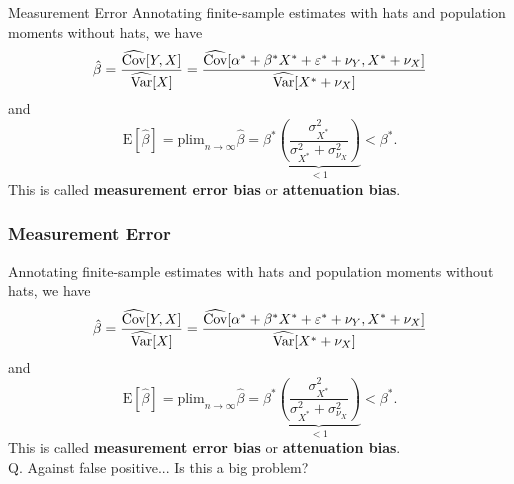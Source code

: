 \begin{frame}{Measurement Error}
    Annotating finite-sample estimates with hats and population moments without hats, we have
\begin{equation*}
    \hat{\beta}
    = \frac{\widehat{\text{Cov}}[Y,X]}{\widehat{\text{Var}}[X]}
    = \frac{\widehat{\text{Cov}}[\alpha^{*} + \beta^{*} X^{*} + \varepsilon^{*} + \nu_{Y}, X^{*}+\nu_{X}]}{\widehat{\text{Var}}[X^{*}+\nu_{X}]}
\end{equation*}
and
\begin{equation*}
    \text{E}[\hat{\beta}] = \text{plim}_{n\rightarrow \infty} \hat{\beta}
    = \beta^{*} \underbrace{\left( \frac{\sigma^{2}_{X^{*}}}{\sigma^{2}_{X^{*}} + \sigma^{2}_{\nu_{X}}} \right)}_{<1} < \beta^{*}.
\end{equation*}
This is called \textbf{measurement error bias} or \textbf{attenuation bias}.\\
\vspace{3mm}
{\color{blue}\phantom{Q. Against false positive... Is this a big problem?}}
\end{frame}

\begin{frame}[noframenumbering]
\frametitle{Measurement Error}
    Annotating finite-sample estimates with hats and population moments without hats, we have
\begin{equation*}
    \hat{\beta}
    = \frac{\widehat{\text{Cov}}[Y,X]}{\widehat{\text{Var}}[X]}
    = \frac{\widehat{\text{Cov}}[\alpha^{*} + \beta^{*} X^{*} + \varepsilon^{*} + \nu_{Y}, X^{*}+\nu_{X}]}{\widehat{\text{Var}}[X^{*}+\nu_{X}]}
\end{equation*}
and
\begin{equation*}
    \text{E}[\hat{\beta}] = \text{plim}_{n\rightarrow \infty} \hat{\beta}
    = \beta^{*} \underbrace{\left( \frac{\sigma^{2}_{X^{*}}}{\sigma^{2}_{X^{*}} + \sigma^{2}_{\nu_{X}}} \right)}_{<1} < \beta^{*}.
\end{equation*}
This is called \textbf{measurement error bias} or \textbf{attenuation bias}.\\
\vspace{3mm}
{\color{blue}Q. Against false positive... Is this a big problem?}
\end{frame}

